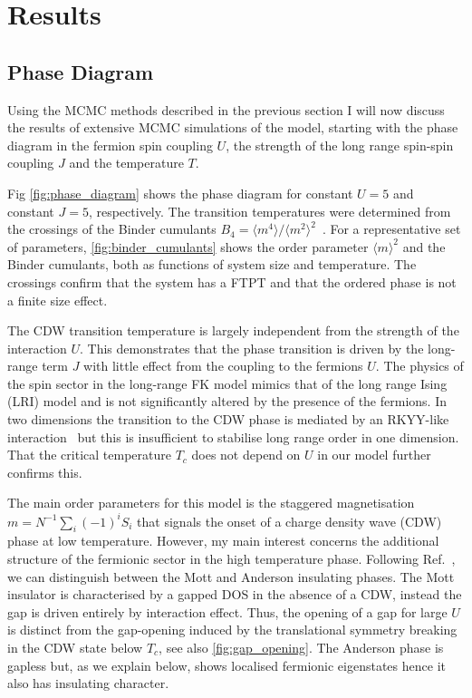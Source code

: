 \hypertarget{fk-results}{%
\section{Results}\label{fk-results}}

\hypertarget{lrfk-results-phase-diagram}{%
\subsection{Phase Diagram}\label{lrfk-results-phase-diagram}}

Using the MCMC methods described in the previous section I will now discuss the results of extensive MCMC simulations of the model, starting with the phase diagram in the fermion spin coupling \(U\), the strength of the long range spin-spin coupling \(J\) and the temperature \(T\).

Fig \cref{fig:phase_diagram} shows the phase diagram for constant \(U=5\) and constant \(J=5\), respectively. The transition temperatures were determined from the crossings of the Binder cumulants \(B_4 = \langle m^4 \rangle /\langle m^2 \rangle^2\)~\autocite{binderFiniteSizeScaling1981}. For a representative set of parameters, \cref{fig:binder_cumulants} shows the order parameter \(\langle m \rangle^2\) and the Binder cumulants, both as functions of system size and temperature. The crossings confirm that the system has a FTPT and that the ordered phase is not a finite size effect.

The CDW transition temperature is largely independent from the strength of the interaction \(U\). This demonstrates that the phase transition is driven by the long-range term \(J\) with little effect from the coupling to the fermions \(U\). The physics of the spin sector in the long-range FK model mimics that of the long range Ising (LRI) model and is not significantly altered by the presence of the fermions. In two dimensions the transition to the CDW phase is mediated by an RKYY-like interaction~\autocite{rusinCalculationRKKYRange2017} but this is insufficient to stabilise long range order in one dimension. That the critical temperature \(T_c\) does not depend on \(U\) in our model further confirms this.

The main order parameters for this model is the staggered magnetisation \(m = N^{-1} \sum_i (-1)^i S_i\) that signals the onset of a charge density wave (CDW) phase at low temperature. However, my main interest concerns the additional structure of the fermionic sector in the high temperature phase. Following Ref.~\autocite{antipovInteractionTunedAndersonMott2016}, we can distinguish between the Mott and Anderson insulating phases. The Mott insulator is characterised by a gapped DOS in the absence of a CDW, instead the gap is driven entirely by interaction effect. Thus, the opening of a gap for large \(U\) is distinct from the gap-opening induced by the translational symmetry breaking in the CDW state below \(T_c\), see also \cref{fig:gap_opening}. The Anderson phase is gapless but, as we explain below, shows localised fermionic eigenstates hence it also has insulating character.

